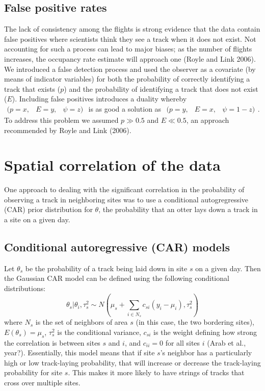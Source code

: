 \documentclass[12pt]{article}
\begin{document}
\subsection{False positive rates}
The lack of consistency among the flights is strong evidence that the data 
contain false positives where scientists think they see a track when it does not 
exist. Not accounting for such a process can lead to major biases; as the number 
of flights increases, the occupancy rate estimate will approach one (Royle and 
Link 2006). We introduced a false detection process and used the observer as a 
covariate (by means of indicator variables) for both the probability of 
correctly identifying a track that exists ($p$) and the probability of 
identifying a track that does not exist ($E$). Including false positives 
introduces a duality whereby 
$\begin{array}{ccc}(p = x, & E = y, & \psi = z)\end{array}$ 
is as good a solution as 
$\begin{array}{ccc}(p = y, & E = x, & \psi = 1-z)\end{array}$. 
To address this problem we assumed $p\gg0.5$ and $E\ll0.5$, an approach 
recommended by Royle and Link (2006).

\section{Spatial correlation of the data}
One approach to dealing with the significant correlation in the probability of 
observing a track in neighboring sites was to use a conditional autogregressive 
(CAR) prior distribution for $\theta$, the probability that an otter lays down a 
track in a site on a given day.

\subsection{Conditional autoregressive (CAR) models}
Let $\theta_s$ be the probability of a track being laid down in site $s$ on a 
given day. Then the Gaussian CAR model can be defined using the following 
conditional distributions:
\begin{equation}\theta_s|\theta_i,\tau_s^2 \sim N(\mu_s+\sum_{i\in N_s}c_{si}
(y_i-\mu_i),\tau_s^2)\end{equation}
where $N_s$ is the set of neighbors of area $s$ (in this case, the two bordering 
sites), $E(\theta_s)=\mu_s$, $\tau_s^2$ is the conditional variance, $c_{si}$ is 
the weight defining how strong the correlation is between sites $s$ and $i$, and 
$c_{ii}=0$ for all sites $i$ (Arab et al., year?). Essentially, this model means 
that if site $s$'s neighbor has a particularly high or low track-laying 
probability, that will increase or decrease the track-laying probability for 
site $s$. This makes it more likely to have strings of tracks that cross over 
multiple sites.
\end{document}
